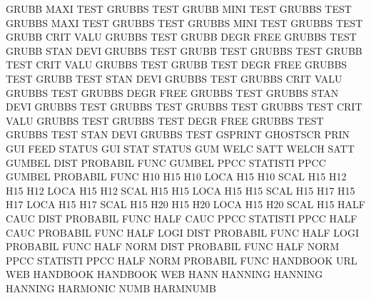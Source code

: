 GRUBB    MAXI TEST                      GRUBBS   TEST
GRUBB    MINI TEST                      GRUBBS   TEST
GRUBBS   MAXI TEST                      GRUBBS   TEST
GRUBBS   MINI TEST                      GRUBBS   TEST
GRUBB    CRIT VALU                      GRUBBS   TEST
GRUBB    DEGR FREE                      GRUBBS   TEST
GRUBB    STAN DEVI                      GRUBBS   TEST
GRUBB    TEST                           GRUBBS   TEST
GRUBB    TEST CRIT VALU                 GRUBBS   TEST
GRUBB    TEST DEGR FREE                 GRUBBS   TEST
GRUBB    TEST STAN DEVI                 GRUBBS   TEST
GRUBBS   CRIT VALU                      GRUBBS   TEST
GRUBBS   DEGR FREE                      GRUBBS   TEST
GRUBBS   STAN DEVI                      GRUBBS   TEST
GRUBBS   TEST                           GRUBBS   TEST
GRUBBS   TEST CRIT VALU                 GRUBBS   TEST
GRUBBS   TEST DEGR FREE                 GRUBBS   TEST
GRUBBS   TEST STAN DEVI                 GRUBBS   TEST
GSPRINT                                 GHOSTSCR PRIN
GUI      FEED                           STATUS
GUI      STAT                           STATUS
GUM      WELC SATT                      WELCH    SATT
GUMBEL   DIST                           PROBABIL FUNC
GUMBEL   PPCC                           STATISTI PPCC
GUMBEL                                  PROBABIL FUNC
H10                                     H15
H10      LOCA                           H15
H10      SCAL                           H15
H12                                     H15
H12      LOCA                           H15
H12      SCAL                           H15
H15      LOCA                           H15
H15      SCAL                           H15
H17                                     H15
H17      LOCA                           H15
H17      SCAL                           H15
H20                                     H15
H20      LOCA                           H15
H20      SCAL                           H15
HALF     CAUC DIST                      PROBABIL FUNC
HALF     CAUC PPCC                      STATISTI PPCC
HALF     CAUC                           PROBABIL FUNC
HALF     LOGI DIST                      PROBABIL FUNC
HALF     LOGI                           PROBABIL FUNC
HALF     NORM DIST                      PROBABIL FUNC
HALF     NORM PPCC                      STATISTI PPCC
HALF     NORM                           PROBABIL FUNC
HANDBOOK URL                            WEB      HANDBOOK
HANDBOOK                                WEB
HANN                                    HANNING
HANNING                                 HANNING
HARMONIC NUMB                           HARMNUMB
